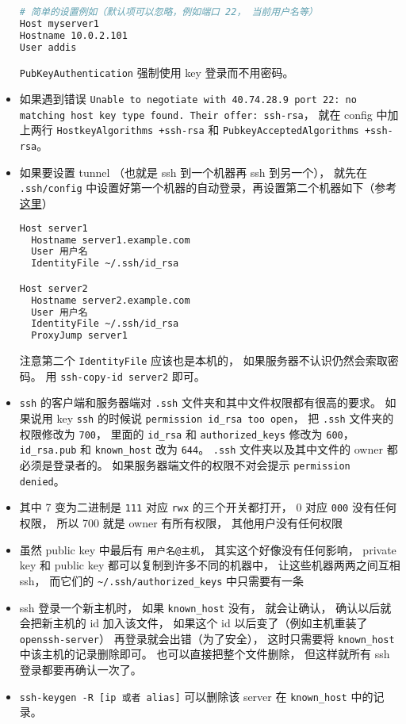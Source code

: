 \begin{itemize}
\begin{lstlisting}[language=bash]
# 简单的设置例如（默认项可以忽略，例如端口 22， 当前用户名等）
Host myserver1
Hostname 10.0.2.101
User addis
\end{lstlisting}
\verb`PubKeyAuthentication` 强制使用 key 登录而不用密码。

\item 如果遇到错误 \verb`Unable to negotiate with 40.74.28.9 port 22: no matching host key type found. Their offer: ssh-rsa`， 就在 config 中加上两行 \verb`HostkeyAlgorithms +ssh-rsa` 和 \verb`PubkeyAcceptedAlgorithms +ssh-rsa`。

\item 如果要设置 tunnel （也就是 ssh 到一个机器再 ssh 到另一个）， 就先在 \verb`.ssh/config` 中设置好第一个机器的自动登录，再设置第二个机器如下（参考\href{https://askubuntu.com/questions/311447/how-do-i-ssh-to-machine-a-via-b-in-one-command}{这里}）
\begin{lstlisting}[language=bash]
Host server1
  Hostname server1.example.com
  User 用户名
  IdentityFile ~/.ssh/id_rsa

Host server2
  Hostname server2.example.com
  User 用户名
  IdentityFile ~/.ssh/id_rsa
  ProxyJump server1
\end{lstlisting}
注意第二个 \verb`IdentityFile` 应该也是本机的， 如果服务器不认识仍然会索取密码。 用 \verb`ssh-copy-id server2` 即可。

\item \verb`ssh` 的客户端和服务器端对 \verb`.ssh` 文件夹和其中文件权限都有很高的要求。 如果说用 key \verb`ssh` 的时候说 \verb`permission id_rsa too open`， 把 \verb`.ssh` 文件夹的权限修改为 \verb`700`， 里面的 \verb`id_rsa` 和 \verb`authorized_keys` 修改为 \verb`600`， \verb`id_rsa.pub` 和 \verb`known_host` 改为 \verb`644`。 \verb`.ssh` 文件夹以及其中文件的 owner 都必须是登录者的。 如果服务器端文件的权限不对会提示 \verb`permission denied`。
\item 其中 7 变为二进制是 \verb`111` 对应 \verb`rwx` 的三个开关都打开， 0 对应 \verb`000` 没有任何权限， 所以 700 就是 owner 有所有权限， 其他用户没有任何权限
\item 虽然 public key 中最后有 \verb`用户名@主机`， 其实这个好像没有任何影响， private key 和 public key 都可以复制到许多不同的机器中， 让这些机器两两之间互相 ssh， 而它们的 \verb`~/.ssh/authorized_keys` 中只需要有一条
\item ssh 登录一个新主机时， 如果 \verb`known_host` 没有， 就会让确认， 确认以后就会把新主机的 id 加入该文件， 如果这个 id 以后变了（例如主机重装了 \verb`openssh-server`） 再登录就会出错（为了安全）， 这时只需要将 \verb`known_host` 中该主机的记录删除即可。 也可以直接把整个文件删除， 但这样就所有 ssh 登录都要再确认一次了。
\item \verb`ssh-keygen -R [ip 或者 alias]` 可以删除该 server 在 \verb`known_host` 中的记录。
\end{itemize}

